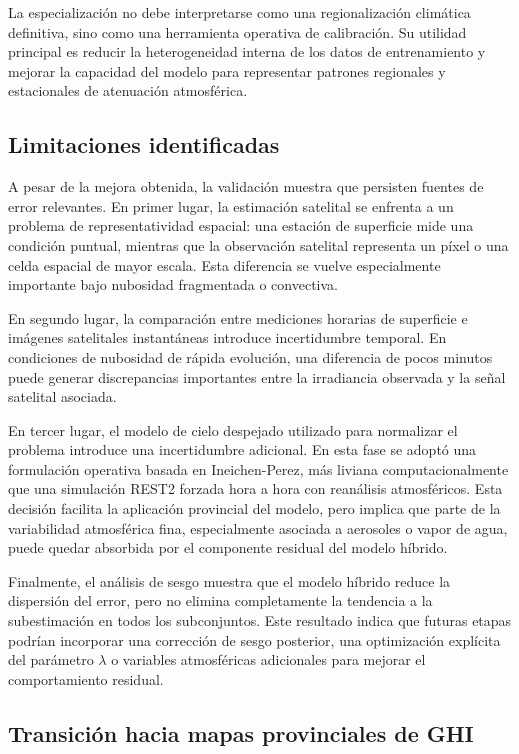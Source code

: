 \documentclass[../main.tex]{subfiles}
\begin{document}
La especialización no debe interpretarse como una regionalización climática definitiva, sino como una herramienta operativa de calibración. Su utilidad principal es reducir la heterogeneidad interna de los datos de entrenamiento y mejorar la capacidad del modelo para representar patrones regionales y estacionales de atenuación atmosférica.

\subsection{Limitaciones identificadas}

A pesar de la mejora obtenida, la validación muestra que persisten fuentes de error relevantes. En primer lugar, la estimación satelital se enfrenta a un problema de representatividad espacial: una estación de superficie mide una condición puntual, mientras que la observación satelital representa un píxel o una celda espacial de mayor escala. Esta diferencia se vuelve especialmente importante bajo nubosidad fragmentada o convectiva.

En segundo lugar, la comparación entre mediciones horarias de superficie e imágenes satelitales instantáneas introduce incertidumbre temporal. En condiciones de nubosidad de rápida evolución, una diferencia de pocos minutos puede generar discrepancias importantes entre la irradiancia observada y la señal satelital asociada.

En tercer lugar, el modelo de cielo despejado utilizado para normalizar el problema introduce una incertidumbre adicional. En esta fase se adoptó una formulación operativa basada en Ineichen-Perez, más liviana computacionalmente que una simulación REST2 forzada hora a hora con reanálisis atmosféricos. Esta decisión facilita la aplicación provincial del modelo, pero implica que parte de la variabilidad atmosférica fina, especialmente asociada a aerosoles o vapor de agua, puede quedar absorbida por el componente residual del modelo híbrido.

Finalmente, el análisis de sesgo muestra que el modelo híbrido reduce la dispersión del error, pero no elimina completamente la tendencia a la subestimación en todos los subconjuntos. Este resultado indica que futuras etapas podrían incorporar una corrección de sesgo posterior, una optimización explícita del parámetro $\lambda$ o variables atmosféricas adicionales para mejorar el comportamiento residual.

\subsection{Transición hacia mapas provinciales de GHI}
\end{document}
